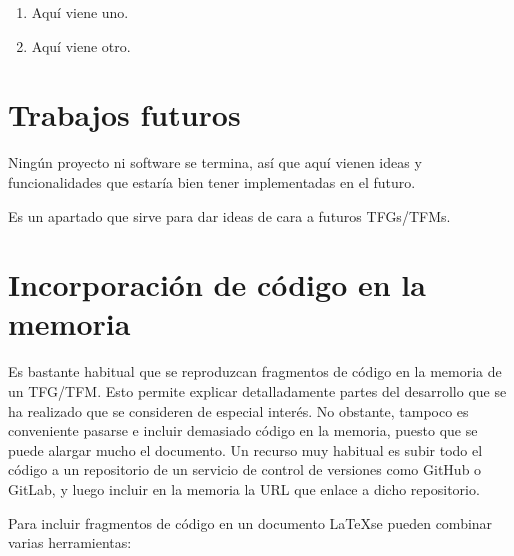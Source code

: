 \begin{enumerate}
    \item Aquí viene uno.
    \item Aquí viene otro.
\end{enumerate}


\section{Trabajos futuros}
\label{sec:trabajos_futuros}

Ningún proyecto ni software se termina, así que aquí vienen ideas y funcionalidades que estaría bien tener implementadas en el futuro.

Es un apartado que sirve para dar ideas de cara a futuros TFGs/TFMs.



\section{Incorporación de código en la memoria}

Es bastante habitual que se reproduzcan fragmentos de código en la memoria de un TFG/TFM.
Esto permite explicar detalladamente partes del desarrollo que se ha realizado que se consideren
de especial interés. No obstante, tampoco es conveniente pasarse e incluir demasiado código en
la memoria, puesto que se puede alargar mucho el documento. Un recurso muy habitual es subir
todo el código a un repositorio de un servicio de control de versiones como GitHub o GitLab,
y luego incluir en la memoria la URL que enlace a dicho repositorio.

Para incluir fragmentos de código en un documento \LaTeX se pueden combinar varias
herramientas:



